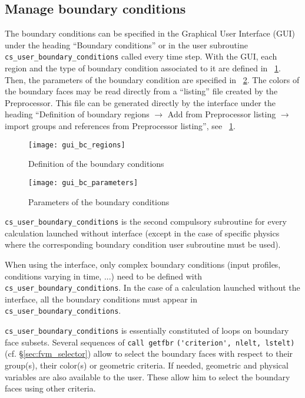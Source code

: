 {{{\subsection{Manage boundary conditions}
\label{sec:prg_boundaryconditions}
The boundary conditions can be specified in the Graphical User Interface (GUI) under the heading ``Boundary conditions'' 
or in the user subroutine \texttt{cs\_user\_boundary\_conditions} called every time step. 
With the GUI, each region and the type of boundary condition associated to it are defined in 
\figurename~\ref{fig:gui_bc_regions}. Then, the parameters of the boundary condition are specified
 in \figurename~\ref{fig:gui_bc_parameters}. The colors of the boundary faces may be read directly from 
a ``listing'' file created by the Preprocessor. This file can be generated directly by the interface 
under the heading ``Definition of boundary regions $\rightarrow$ Add from Preprocessor listing $\rightarrow$ import groups and references from Preprocessor listing'', see \figurename~\ref{fig:gui_bc_regions}.
%
\begin{figure}[!ht]
\begin{center}
\texttt{[image: gui\_bc\_regions]}
\caption{Definition of the boundary conditions}
\label{fig:gui_bc_regions}
\end{center}
\end{figure}
%
\begin{figure}[!ht]
\begin{center}
\texttt{[image: gui\_bc\_parameters]}
\caption{Parameters of the boundary conditions}
\label{fig:gui_bc_parameters}
\end{center}
\end{figure}

\texttt{cs\_user\_boundary\_conditions} is the second compulsory subroutine for every calculation launched
without interface (except in the case of specific physics where the
corresponding boundary condition user subroutine must be used).

When using the interface, only complex boundary conditions (input profiles, conditions varying in time, ...)
need to be defined with \texttt{cs\_user\_boundary\_conditions}.
In the case of a calculation launched without the
interface, all the boundary conditions must appear in \texttt{cs\_user\_boundary\_conditions}.

\texttt{cs\_user\_boundary\_conditions} is essentially constituted of loops on boundary
face subsets. Several sequences
of \verb+call getfbr+ \verb+('criterion', nlelt, lstelt)+ (cf.
\S\ref{sec:fvm_selector}) allow to select
the boundary faces with respect to their group(s), their
color(s) or geometric criteria. If needed, geometric and
physical variables are also available to the user. These allow him
to select the boundary faces using other criteria.

}}}
